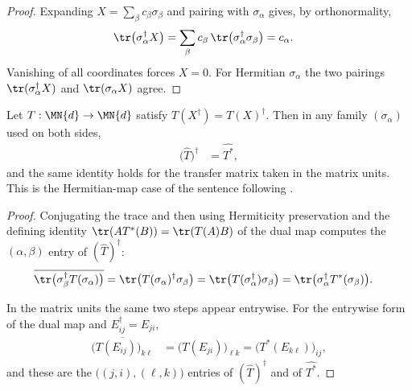 \begin{proof}\leanok
    Expanding $X=\sum_\beta c_\beta\sigma_\beta$ and pairing with
    $\sigma_\alpha$ gives, by orthonormality,
    \begin{align}
        \tr\bigl(\sigma_\alpha^\dagger X\bigr)
        &= \sum_\beta c_\beta\,\tr\bigl(\sigma_\alpha^\dagger\sigma_\beta\bigr)
         = c_\alpha.
    \end{align}
    Vanishing of all coordinates forces $X=0$. For Hermitian $\sigma_\alpha$ the
    two pairings $\tr(\sigma_\alpha^\dagger X)$ and $\tr(\sigma_\alpha X)$
    agree.
\end{proof}

\begin{lemma}
    \label{lem:transfer_matrix_of_basis_dual}
    \leanok
    Let $T:\MN{d}\to\MN{d}$ satisfy $T(X^\dagger)=T(X)^\dagger$. Then in any
    family $(\sigma_\alpha)$ used on both sides,
    \begin{align}
        \bigl(\widehat T\bigr)^\dagger &= \widehat{T^*},
    \end{align}
    and the same identity holds for the transfer matrix taken in the matrix
    units. This is the Hermitian-map case of the sentence following
    \cite[Equation~(2.20)]{Wolf2012Quantum}.
\end{lemma}

\begin{proof}\leanok
    Conjugating the trace and then using Hermiticity preservation and the
    defining identity $\tr(AT^*(B))=\tr(T(A)B)$ of the dual map computes the
    $(\alpha,\beta)$ entry of $(\widehat T)^\dagger$:
    \begin{align}
        \overline{\tr\bigl(\sigma_\beta^\dagger T(\sigma_\alpha)\bigr)}
        &= \tr\bigl(T(\sigma_\alpha)^\dagger\sigma_\beta\bigr)
         = \tr\bigl(T(\sigma_\alpha^\dagger)\sigma_\beta\bigr)
         = \tr\bigl(\sigma_\alpha^\dagger T^*(\sigma_\beta)\bigr).
    \end{align}

    In the matrix units the same two steps appear entrywise. For the entrywise
    form of the dual map and $E_{ij}^\dagger=E_{ji}$,
    \begin{align}
        \overline{\bigl(T(E_{ij})\bigr)_{k\ell}}
        &= \bigl(T(E_{ji})\bigr)_{\ell k}
         = \bigl(T^*(E_{k\ell})\bigr)_{ij},
    \end{align}
    and these are the $\bigl((j,i),(\ell,k)\bigr)$ entries of
    $(\widehat T)^\dagger$ and of $\widehat{T^*}$.
\end{proof}

